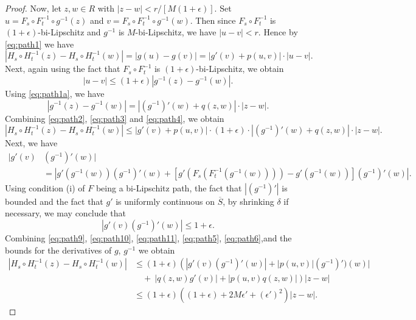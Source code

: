 \documentclass{amsart}
\begin{document}
\begin{proof}
Now, let $z,w\in R$ with $|z-w|<r/[M(1+\epsilon)]$. Set $u= F_s \circ F_t^{-1}\circ g^{-1}(z)$ and $v= F_s \circ F_t^{-1}\circ g^{-1}(w)$. Then since $F_s\circ F_t^{-1}$ is $(1+\epsilon)$-bi-Lipschitz and $g^{-1}$ is $M$-bi-Lipschitz, we have $|u-v| <r$. Hence by \eqref{eq:path1} we have
\begin{equation}
\label{eq:path2}
|H_s\circ H_t^{-1} (z) - H_s\circ H_t^{-1} (w) | = |g(u)- g(v)| = | g'(v ) + p(u , v ) | \cdot |  u - v| .
\end{equation}
Next, again using the fact that $F_s\circ F_t^{-1}$ is $(1+\epsilon)$-bi-Lipschitz, we obtain
\begin{equation}
\label{eq:path3} 
|  u - v| \leq (1+\epsilon)| g^{-1}(z) - g^{-1}(w) |.
\end{equation}
Using \eqref{eq:path1a}, we have
\begin{equation}
\label{eq:path4}
|g^{-1}(z) - g^{-1}(w)| = | (g^{-1})'(w) + q(z,w) | \cdot |z-w|.
\end{equation}
Combining \eqref{eq:path2}, \eqref{eq:path3} and \eqref{eq:path4}, we obtain
\begin{equation}
\label{eq:path5} 
|H_s\circ H_t^{-1} (z) - H_s\circ H_t^{-1} (w) | \leq | g'(v ) + p(u , v ) | \cdot (1+\epsilon) \cdot | (g^{-1})'(w) + q(z,w) | \cdot |z-w|.
\end{equation}
Next, we have
\begin{align*}
|g'(v)&(g^{-1})'(w)|\\ 
&= | g'(g^{-1}(w))(g^{-1})'(w) + \left [ g'(F_s(F_t^{-1}(g^{-1}(w)) )) - g'(g^{-1}(w)) \right ] (g^{-1})'(w) |.
\end{align*}
Using condition (i) of $F$ being a bi-Lipschitz path, the fact that $|(g^{-1})'|$ is bounded and the fact that $g'$ is uniformly continuous on $\overline{S}$, by shrinking $\delta$ if necessary, we may conclude that 
\begin{equation}
\label{eq:path6}
|g'(v)(g^{-1})'(w)|  \leq 1+\epsilon.
\end{equation}
Combining \eqref{eq:path9}, \eqref{eq:path10}, \eqref{eq:path11}, \eqref{eq:path5}, \eqref{eq:path6},and  the bounds for the derivatives of $g$, $g^{-1}$ we obtain
\begin{align*}
|H_s\circ H_t^{-1} (z) - H_s\circ H_t^{-1} (w) |  &\leq (1+\epsilon)\left ( |g'(v)(g^{-1})'(w)| + |p(u,v)|(g^{-1})')(w) | \right . \\
& \left . \quad + \: |q(z,w) g'(v)| + |p(u,v)q(z,w)| \right ) |z-w|\\
&\leq (1+\epsilon) \left ( (1+\epsilon) + 2M\epsilon ' + (\epsilon ')^2 \right ) |z-w|.
\end{align*}


\end{proof}
\end{document}
